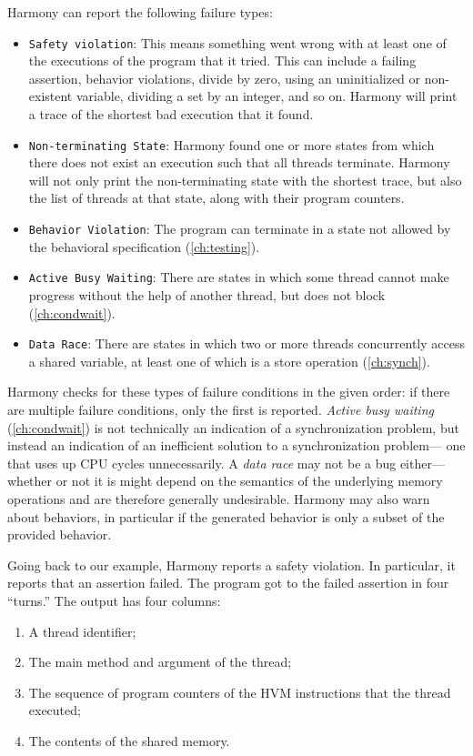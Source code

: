 \documentclass{report}
\begin{document}
Harmony can report the following failure types:
\begin{itemize}
\item \texttt{Safety violation}: This means something went wrong with
at least one of the executions of the program that it tried.  This
can include a failing assertion, behavior violations, divide by zero,
using an uninitialized
or non-existent variable, dividing a set by an integer, and so on.
Harmony will print a trace of the shortest bad execution that it found.
\item \texttt{Non-terminating State}: Harmony found one or more states
from which there does not exist an execution such that all threads
terminate.  Harmony will not only print the non-terminating state with
the shortest trace, but also the list of threads
at that state, along with their program counters.
\item \texttt{Behavior Violation}:  The program can terminate in a state
not allowed by the behavioral specification (\autoref{ch:testing}).
\item \texttt{Active Busy Waiting}:  There are states in which
some thread cannot make progress without the help of another thread,
but does not block (\autoref{ch:condwait}).
\item \texttt{Data Race}: There are states in which two or more threads
concurrently access a shared variable, at least one of which is a store
operation (\autoref{ch:synch}).
\end{itemize}

Harmony checks for these types of failure conditions in the given
order: if there are multiple failure conditions, only the first is
reported.
\emph{Active busy waiting} (\autoref{ch:condwait}) is not
technically an indication of a synchronization problem, but instead an
indication of an inefficient solution to a synchronization problem---
one that uses up CPU cycles unnecessarily.
A \emph{data race} may not be a bug either---whether or
not it is might depend on the semantics of the underlying memory
operations and are therefore generally undesirable.
Harmony may also warn about behaviors, in particular if the generated
behavior is only a subset of the provided behavior.

Going back to our example, Harmony reports a safety violation.
In particular, it reports that an assertion failed.
The program got to the failed assertion in four ``turns.''
The output has four columns:
\begin{enumerate}
\item A thread identifier;
\item The main method and argument of the thread;
\item The sequence of program counters of the HVM instructions that the thread executed;
\item The contents of the shared memory.
\end{enumerate}
\end{document}
